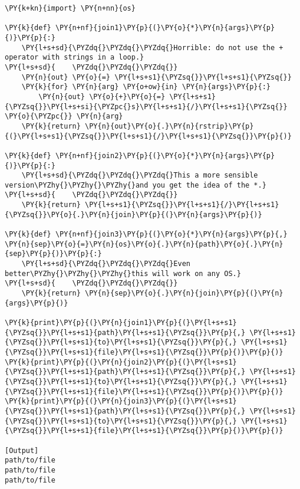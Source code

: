 \begin{Verbatim}[label=\makebox{\url{https://github.com/lucabaldini/cmepda/tree/master/slides/latex/snippets/func\_variadic2.py}},commandchars=\\\{\}]
\PY{k+kn}{import} \PY{n+nn}{os}

\PY{k}{def} \PY{n+nf}{join1}\PY{p}{(}\PY{o}{*}\PY{n}{args}\PY{p}{)}\PY{p}{:}
    \PY{l+s+sd}{\PYZdq{}\PYZdq{}\PYZdq{}Horrible: do not use the + operator with strings in a loop.}
\PY{l+s+sd}{    \PYZdq{}\PYZdq{}\PYZdq{}}
    \PY{n}{out} \PY{o}{=} \PY{l+s+s1}{\PYZsq{}}\PY{l+s+s1}{\PYZsq{}}
    \PY{k}{for} \PY{n}{arg} \PY{o+ow}{in} \PY{n}{args}\PY{p}{:}
        \PY{n}{out} \PY{o}{+}\PY{o}{=} \PY{l+s+s1}{\PYZsq{}}\PY{l+s+si}{\PYZpc{}s}\PY{l+s+s1}{/}\PY{l+s+s1}{\PYZsq{}} \PY{o}{\PYZpc{}} \PY{n}{arg}
    \PY{k}{return} \PY{n}{out}\PY{o}{.}\PY{n}{rstrip}\PY{p}{(}\PY{l+s+s1}{\PYZsq{}}\PY{l+s+s1}{/}\PY{l+s+s1}{\PYZsq{}}\PY{p}{)}

\PY{k}{def} \PY{n+nf}{join2}\PY{p}{(}\PY{o}{*}\PY{n}{args}\PY{p}{)}\PY{p}{:}
    \PY{l+s+sd}{\PYZdq{}\PYZdq{}\PYZdq{}This a more sensible version\PYZhy{}\PYZhy{}\PYZhy{}and you get the idea of the *.}
\PY{l+s+sd}{    \PYZdq{}\PYZdq{}\PYZdq{}}
    \PY{k}{return} \PY{l+s+s1}{\PYZsq{}}\PY{l+s+s1}{/}\PY{l+s+s1}{\PYZsq{}}\PY{o}{.}\PY{n}{join}\PY{p}{(}\PY{n}{args}\PY{p}{)}

\PY{k}{def} \PY{n+nf}{join3}\PY{p}{(}\PY{o}{*}\PY{n}{args}\PY{p}{,} \PY{n}{sep}\PY{o}{=}\PY{n}{os}\PY{o}{.}\PY{n}{path}\PY{o}{.}\PY{n}{sep}\PY{p}{)}\PY{p}{:}
    \PY{l+s+sd}{\PYZdq{}\PYZdq{}\PYZdq{}Even better\PYZhy{}\PYZhy{}\PYZhy{}this will work on any OS.}
\PY{l+s+sd}{    \PYZdq{}\PYZdq{}\PYZdq{}}
    \PY{k}{return} \PY{n}{sep}\PY{o}{.}\PY{n}{join}\PY{p}{(}\PY{n}{args}\PY{p}{)}

\PY{k}{print}\PY{p}{(}\PY{n}{join1}\PY{p}{(}\PY{l+s+s1}{\PYZsq{}}\PY{l+s+s1}{path}\PY{l+s+s1}{\PYZsq{}}\PY{p}{,} \PY{l+s+s1}{\PYZsq{}}\PY{l+s+s1}{to}\PY{l+s+s1}{\PYZsq{}}\PY{p}{,} \PY{l+s+s1}{\PYZsq{}}\PY{l+s+s1}{file}\PY{l+s+s1}{\PYZsq{}}\PY{p}{)}\PY{p}{)}
\PY{k}{print}\PY{p}{(}\PY{n}{join2}\PY{p}{(}\PY{l+s+s1}{\PYZsq{}}\PY{l+s+s1}{path}\PY{l+s+s1}{\PYZsq{}}\PY{p}{,} \PY{l+s+s1}{\PYZsq{}}\PY{l+s+s1}{to}\PY{l+s+s1}{\PYZsq{}}\PY{p}{,} \PY{l+s+s1}{\PYZsq{}}\PY{l+s+s1}{file}\PY{l+s+s1}{\PYZsq{}}\PY{p}{)}\PY{p}{)}
\PY{k}{print}\PY{p}{(}\PY{n}{join3}\PY{p}{(}\PY{l+s+s1}{\PYZsq{}}\PY{l+s+s1}{path}\PY{l+s+s1}{\PYZsq{}}\PY{p}{,} \PY{l+s+s1}{\PYZsq{}}\PY{l+s+s1}{to}\PY{l+s+s1}{\PYZsq{}}\PY{p}{,} \PY{l+s+s1}{\PYZsq{}}\PY{l+s+s1}{file}\PY{l+s+s1}{\PYZsq{}}\PY{p}{)}\PY{p}{)}

[Output]
path/to/file
path/to/file
path/to/file
\end{Verbatim}